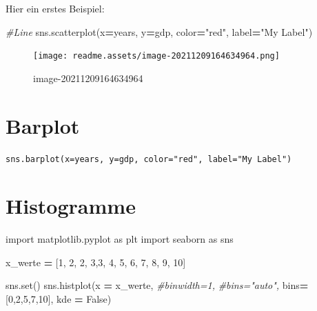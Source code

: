\documentclass[
  oneside]{book}
\newenvironment{Shaded}{\begin{snugshade}}{\end{snugshade}}
\newcommand{\BuiltInTok}[1]{#1}
\newcommand{\CommentTok}[1]{\textcolor[rgb]{0.56,0.35,0.01}{\textit{#1}}}
\newcommand{\DecValTok}[1]{\textcolor[rgb]{0.00,0.00,0.81}{#1}}
\newcommand{\ImportTok}[1]{#1}
\newcommand{\NormalTok}[1]{#1}
\newcommand{\OperatorTok}[1]{\textcolor[rgb]{0.81,0.36,0.00}{\textbf{#1}}}
\newcommand{\StringTok}[1]{\textcolor[rgb]{0.31,0.60,0.02}{#1}}
\newcommand{\VariableTok}[1]{\textcolor[rgb]{0.00,0.00,0.00}{#1}}
\begin{document}
Hier ein erstes Beispiel:

\begin{Shaded}
\begin{Highlighting}[]
\CommentTok{\#Line}
\NormalTok{sns.scatterplot(x}\OperatorTok{=}\NormalTok{years, y}\OperatorTok{=}\NormalTok{gdp, color}\OperatorTok{=}\StringTok{"red"}\NormalTok{, label}\OperatorTok{=}\StringTok{"My Label"}\NormalTok{)}
\end{Highlighting}
\end{Shaded}

\begin{figure}
\centering
\texttt{[image: readme.assets/image-20211209164634964.png]}
\caption{image-20211209164634964}
\end{figure}

\hypertarget{barplot}{%
\section{Barplot}\label{barplot}}

\begin{verbatim}
sns.barplot(x=years, y=gdp, color="red", label="My Label")
\end{verbatim}

\hypertarget{histogramme}{%
\section{Histogramme}\label{histogramme}}

\begin{Shaded}
\begin{Highlighting}[]
\ImportTok{import}\NormalTok{ matplotlib.pyplot }\ImportTok{as}\NormalTok{ plt}
\ImportTok{import}\NormalTok{ seaborn }\ImportTok{as}\NormalTok{ sns}

\NormalTok{x\_werte }\OperatorTok{=}\NormalTok{  [}\DecValTok{1}\NormalTok{, }\DecValTok{2}\NormalTok{, }\DecValTok{2}\NormalTok{, }\DecValTok{3}\NormalTok{,}\DecValTok{3}\NormalTok{, }\DecValTok{4}\NormalTok{, }\DecValTok{5}\NormalTok{, }\DecValTok{6}\NormalTok{, }\DecValTok{7}\NormalTok{, }\DecValTok{8}\NormalTok{, }\DecValTok{9}\NormalTok{, }\DecValTok{10}\NormalTok{]}

\NormalTok{sns.}\BuiltInTok{set}\NormalTok{()}
\NormalTok{sns.histplot(x }\OperatorTok{=}\NormalTok{ x\_werte,}
             \CommentTok{\#binwidth=1,}
             \CommentTok{\#bins="auto",}
\NormalTok{             bins}\OperatorTok{=}\NormalTok{[}\DecValTok{0}\NormalTok{,}\DecValTok{2}\NormalTok{,}\DecValTok{5}\NormalTok{,}\DecValTok{7}\NormalTok{,}\DecValTok{10}\NormalTok{],}
\NormalTok{             kde }\OperatorTok{=} \VariableTok{False}\NormalTok{)}
\end{Highlighting}
\end{Shaded}
\end{document}
